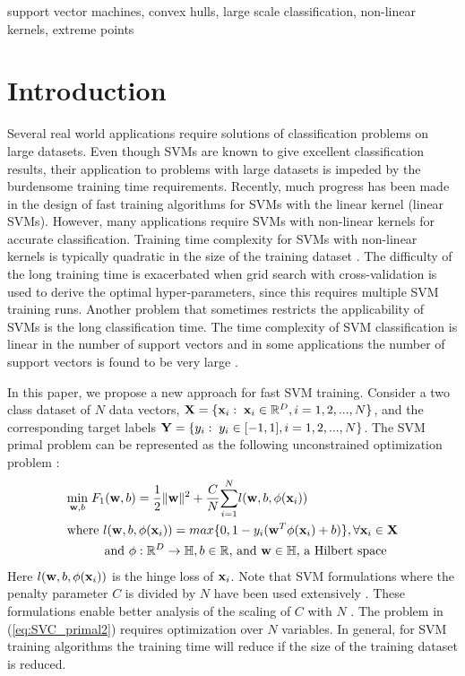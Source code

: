 \documentclass[twoside]{article}
\begin{document}
\begin{keywords}
  support vector machines, convex hulls, large scale classification, non-linear kernels, extreme points
\end{keywords}

\section{Introduction}

Several real world applications require solutions of classification problems on large datasets. Even though SVMs are known to give excellent classification results, their application to problems with large datasets is impeded by the burdensome training time requirements. Recently, much progress has been made in the design of fast training algorithms \citep{Fan08,Shwartz11} for SVMs with the linear kernel (linear SVMs). However, many applications require SVMs with non-linear kernels for accurate classification. Training time complexity for SVMs with non-linear kernels is typically quadratic in the size of the training dataset \citep{Shalev08}. The difficulty of the long training time is exacerbated when grid search with cross-validation is used to derive the optimal hyper-parameters, since this requires multiple SVM training runs. Another problem that sometimes restricts the applicability of SVMs is the long classification time. The time complexity of SVM classification is linear in the number of support vectors and in some applications the number of support vectors is found to be very large \citep{Guo05}.

In this paper, we propose a new approach for fast SVM training. Consider a two class dataset of $N$ data vectors, ${\bf X} = \{{\bf x}_i: \; {\bf x}_i \in \mathbb{R}^D, i = 1,2,...,N\}$, and the corresponding target labels ${\bf Y} = \{y_i:\; y_{i}\in[-1, 1], i = 1,2,...,N\}$. The SVM primal problem can be represented as the following unconstrained optimization problem \citep{Teo10,Shwartz11}:
\begin{align}
&\underset{\mathbf{w},b}{\mathit{\min}}\;{F}_1(\mathbf{w} ,b) = \frac{1}{2}\|{\mathbf{w}}\|^2 + \frac{C}{N}\overset{N}{\underset{i = 1}\sum}l(\mathbf{w},b,\phi({\bf x}_i)) \label{eq:SVC_primal2} \\
&\text{where } l(\mathbf{w},b,\phi({\bf x}_i)) = max\{0, 1- y_{i}(\mathbf{w} ^T \phi({\bf x}_i) + b)\}, \forall {\bf x}_i \in {\bf X} \nonumber\\
&\hspace{30pt}\text{and }\phi: \mathbb{R}^D \rightarrow \mathbb{H}, b \in \mathbb{R} \text{, and } {\bf w} \in \mathbb{H} \text{, a Hilbert space} \nonumber
\end{align}
Here $l(\mathbf{w},b,\phi({\bf x}_i))$ is the hinge loss of ${\bf x}_i$. Note that SVM formulations where the penalty parameter $C$ is divided by $N$ have been used extensively \citep{Scholkopf00,Franc08,Joachims09}. These formulations enable better analysis of the scaling of $C$ with $N$ \citep{Joachims06}. The problem in (\ref{eq:SVC_primal2}) requires  optimization over $N$ variables. In general, for SVM training algorithms the training time will reduce if the size of the training dataset is reduced.
\end{document}
